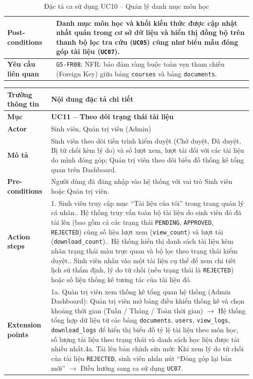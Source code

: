 \begin{table}[H]
\begin{tabularx}{\textwidth}{|p{3.5cm}|X|}
\hline
\textbf{Post-conditions} & Danh mục môn học và khối kiến thức được cập nhật nhất quán trong cơ sở dữ liệu và hiển thị đồng bộ trên thanh bộ lọc tra cứu (\texttt{UC05}) cũng như biểu mẫu đóng góp tài liệu (\texttt{UC07}). \\
\hline
\textbf{Yêu cầu liên quan} & \texttt{G5-FR08}; NFR: bảo đảm ràng buộc toàn vẹn tham chiếu (Foreign Key) giữa bảng \texttt{courses} và bảng \texttt{documents}. \\
\hline
\end{tabularx}
\caption{Đặc tả ca sử dụng UC10 -- Quản lý danh mục môn học}
\label{tab:uc10}
\end{table}


\begin{table}[H]
\centering
\footnotesize\linespread{1.05}\selectfont
\setlength{\tabcolsep}{5pt}
\renewcommand{\arraystretch}{1.12}
\begin{tabularx}{\textwidth}{|p{3.5cm}|X|}
\hline
\rowcolor[HTML]{EAEAEA}
\textbf{Trường thông tin} & \textbf{Nội dung đặc tả chi tiết} \\
\hline
\textbf{Mục} & \textbf{UC11 -- Theo dõi trạng thái tài liệu} \\
\hline
\textbf{Actor} & Sinh viên, Quản trị viên (Admin) \\
\hline
\textbf{Mô tả} & Sinh viên theo dõi tiến trình kiểm duyệt (Chờ duyệt, Đã duyệt, Bị từ chối kèm lý do) và số lượt xem, lượt tải đối với các tài liệu do mình đóng góp; Quản trị viên theo dõi biểu đồ thống kê tổng quan trên Dashboard. \\
\hline
\textbf{Pre-conditions} & Người dùng đã đăng nhập vào hệ thống với vai trò Sinh viên hoặc Quản trị viên. \\
\hline
\textbf{Action steps} & 1. Sinh viên truy cập mục ``Tài liệu của tôi'' trong trang quản lý cá nhân.\newline 2. Hệ thống truy vấn toàn bộ tài liệu do sinh viên đó đã tải lên (bao gồm cả các trạng thái \texttt{PENDING}, \texttt{APPROVED}, \texttt{REJECTED}) cùng số liệu lượt xem (\texttt{view\_count}) và lượt tải (\texttt{download\_count}).\newline 3. Hệ thống hiển thị danh sách tài liệu kèm nhãn trạng thái màu trực quan và bộ lọc theo trạng thái kiểm duyệt.\newline 4. Sinh viên nhấn vào một tài liệu cụ thể để xem chi tiết lịch sử thẩm định, lý do từ chối (nếu trạng thái là \texttt{REJECTED}) hoặc số liệu thống kê tương tác của tài liệu đó. \\
\hline
\textbf{Extension points} & 1a. Quản trị viên xem thống kê tổng quan hệ thống (Admin Dashboard): Quản trị viên mở bảng điều khiển thống kê và chọn khoảng thời gian (Tuần / Tháng / Toàn thời gian) $\rightarrow$ Hệ thống tổng hợp dữ liệu từ các bảng \texttt{documents}, \texttt{users}, \texttt{view\_logs}, \texttt{download\_logs} để hiển thị biểu đồ tỷ lệ tài liệu theo môn học, số lượng tài liệu theo trạng thái và danh sách học liệu được tải nhiều nhất.\newline 4a. Tải lên bản chỉnh sửa mới: Khi xem lý do từ chối của tài liệu \texttt{REJECTED}, sinh viên nhấn nút ``Đóng góp lại bản mới'' $\rightarrow$ Điều hướng sang ca sử dụng \texttt{UC07}. \\

\end{tabularx}
\end{table}
